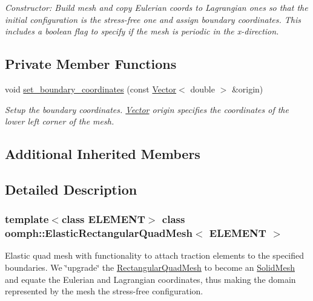 \begin{DoxyCompactItemize}
\begin{DoxyCompactList}\small\item\em Constructor\+: Build mesh and copy Eulerian coords to Lagrangian ones so that the initial configuration is the stress-\/free one and assign boundary coordinates. This includes a boolean flag to specify if the mesh is periodic in the x-\/direction. \end{DoxyCompactList}\end{DoxyCompactItemize}
\subsection*{Private Member Functions}
\begin{DoxyCompactItemize}
\item 
void \hyperlink{classoomph_1_1ElasticRectangularQuadMesh_a84db22a37c49bf3958e149d67997bead}{set\+\_\+boundary\+\_\+coordinates} (const \hyperlink{classoomph_1_1Vector}{Vector}$<$ double $>$ \&origin)
\begin{DoxyCompactList}\small\item\em Setup the boundary coordinates. \hyperlink{classoomph_1_1Vector}{Vector} origin specifies the coordinates of the lower left corner of the mesh. \end{DoxyCompactList}\end{DoxyCompactItemize}
\subsection*{Additional Inherited Members}


\subsection{Detailed Description}
\subsubsection*{template$<$class E\+L\+E\+M\+E\+NT$>$\newline
class oomph\+::\+Elastic\+Rectangular\+Quad\+Mesh$<$ E\+L\+E\+M\+E\+N\+T $>$}

Elastic quad mesh with functionality to attach traction elements to the specified boundaries. We \char`\"{}upgrade\char`\"{} the \hyperlink{classoomph_1_1RectangularQuadMesh}{Rectangular\+Quad\+Mesh} to become an \hyperlink{classoomph_1_1SolidMesh}{Solid\+Mesh} and equate the Eulerian and Lagrangian coordinates, thus making the domain represented by the mesh the stress-\/free configuration. 

